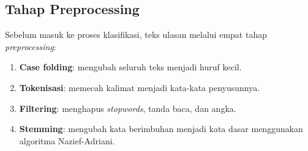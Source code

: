\subsection{Tahap Preprocessing}

Sebelum masuk ke proses klasifikasi, teks ulasan melalui empat tahap \emph{preprocessing}:

\begin{enumerate}
  \item \textbf{Case folding}: mengubah seluruh teks menjadi huruf kecil.
  \item \textbf{Tokenisasi}: memecah kalimat menjadi kata-kata penyusunnya.
  \item \textbf{Filtering}: menghapus \emph{stopwords}, tanda baca, dan angka.
  \item \textbf{Stemming}: mengubah kata berimbuhan menjadi kata dasar menggunakan algoritma Nazief-Adriani.
\end{enumerate}
